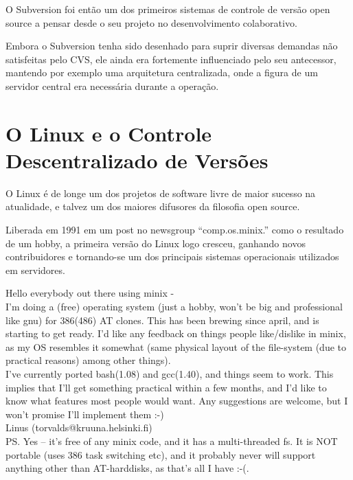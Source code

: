 O Subversion foi então um dos primeiros sistemas de controle de versão
open source a pensar desde o seu projeto no desenvolvimento colaborativo.

Embora o Subversion tenha sido desenhado para suprir diversas demandas
não satisfeitas pelo CVS, ele ainda era fortemente influenciado pelo seu
antecessor, mantendo por exemplo uma arquitetura centralizada, onde a
figura de um servidor central era necessária durante a operação.

\section{O Linux e o Controle Descentralizado de Versões}

O Linux é de longe um dos projetos de software livre de maior sucesso na
atualidade, e talvez um dos maiores difusores da filosofia open source.

Liberada em 1991 em um post no newsgroup ``comp.os.minix.'' como o resultado
de um hobby, a primeira versão do Linux logo cresceu, ganhando novos
contribuidores e tornando-se um dos principais sistemas operacionais utilizados
em servidores.

\begin{citacao}

Hello everybody out there using minix -\\

I'm doing a (free) operating system (just a hobby, won't be big and professional like gnu) for 386(486) AT clones. This has been brewing since april, and is starting to get ready. I'd like any feedback on things people like/dislike in minix, as my OS resembles it somewhat (same physical layout of the file-system (due to practical reasons) among other things).\\

I've currently ported bash(1.08) and gcc(1.40), and things seem to work. This implies that I'll get something practical within a few months, and I'd like to know what features most people would want. Any suggestions are welcome, but I won't promise I'll implement them :-)\\

Linus (torvalds@kruuna.helsinki.fi)\\

PS. Yes – it's free of any minix code, and it has a multi-threaded fs. It is NOT portable (uses 386 task switching etc), and it probably never will support anything other than AT-harddisks, as that's all I have :-(.\\

\cite{Torvalds}
\end{citacao}

